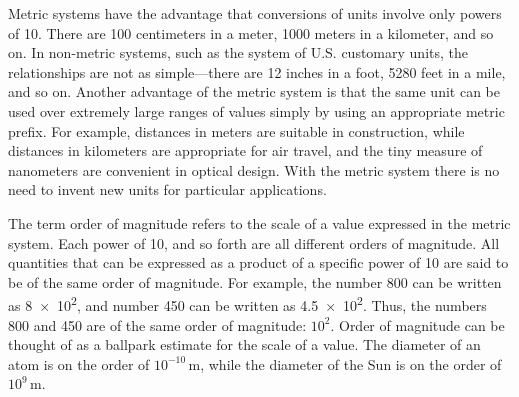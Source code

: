 \documentclass[main-ap-physics.tex]{subfiles}
\begin{document}
\vspace{1em}

Metric systems have the advantage that conversions of units involve only powers of 10. There are 100 centimeters in a meter, 1000 meters in a kilometer, and so on. In non-metric systems, such as the system of U.S. customary units, the relationships are not as simple---there are 12 inches in a foot, 5280 feet in a mile, and so on. Another advantage of the metric system is that the same unit can be used over extremely large ranges of values simply by using an appropriate metric prefix. For example, distances in meters are suitable in construction, while distances in kilometers are appropriate for air travel, and the tiny measure of nanometers are convenient in optical design. With the metric system there is no need to invent new units for particular applications.

\vspace{1em}

The term \gls{order of magnitude} refers to the scale of a value expressed in the metric system. Each power of 10, and so forth are all different orders of magnitude. All quantities that can be expressed as a product of a specific power of 10 are said to be of the same order of magnitude. For example, the number 800 can be written as \num{8e2}, and number 450 can be written as \num{4.5e2}. Thus, the numbers 800 and 450 are of the same order of magnitude: $10^2$. Order of magnitude can be thought of as a ballpark estimate for the scale of a value. The diameter of an atom is on the order of $10^{-10}\,\text{m}$, while the diameter of the Sun is on the order of $10^9\,\text{m}$.
\end{document}
